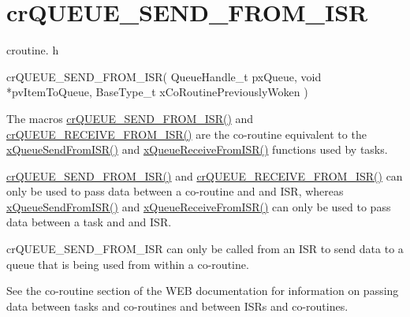 \hypertarget{group__cr_q_u_e_u_e___s_e_n_d___f_r_o_m___i_s_r}{}\section{cr\+Q\+U\+E\+U\+E\+\_\+\+S\+E\+N\+D\+\_\+\+F\+R\+O\+M\+\_\+\+I\+SR}
\label{group__cr_q_u_e_u_e___s_e_n_d___f_r_o_m___i_s_r}
croutine. h 
\begin{DoxyPre}
 crQUEUE\_SEND\_FROM\_ISR(
                           QueueHandle\_t pxQueue,
                           void *pvItemToQueue,
                           BaseType\_t xCoRoutinePreviouslyWoken
                      )\end{DoxyPre}


The macro\textquotesingle{}s \mbox{\hyperlink{croutine_8h_ac8eb0a81c5cf69de7e4edd73ce44a3be}{cr\+Q\+U\+E\+U\+E\+\_\+\+S\+E\+N\+D\+\_\+\+F\+R\+O\+M\+\_\+\+I\+S\+R()}} and \mbox{\hyperlink{croutine_8h_a9c0fa977ca69adbddb4811affa2a71f7}{cr\+Q\+U\+E\+U\+E\+\_\+\+R\+E\+C\+E\+I\+V\+E\+\_\+\+F\+R\+O\+M\+\_\+\+I\+S\+R()}} are the co-\/routine equivalent to the \mbox{\hyperlink{queue_8h_a21d5919ed26c21d121df4a4debeb643c}{x\+Queue\+Send\+From\+I\+S\+R()}} and \mbox{\hyperlink{queue_8h_acdf528f5c91131ae2f31c669cfd65758}{x\+Queue\+Receive\+From\+I\+S\+R()}} functions used by tasks.

\mbox{\hyperlink{croutine_8h_ac8eb0a81c5cf69de7e4edd73ce44a3be}{cr\+Q\+U\+E\+U\+E\+\_\+\+S\+E\+N\+D\+\_\+\+F\+R\+O\+M\+\_\+\+I\+S\+R()}} and \mbox{\hyperlink{croutine_8h_a9c0fa977ca69adbddb4811affa2a71f7}{cr\+Q\+U\+E\+U\+E\+\_\+\+R\+E\+C\+E\+I\+V\+E\+\_\+\+F\+R\+O\+M\+\_\+\+I\+S\+R()}} can only be used to pass data between a co-\/routine and and I\+SR, whereas \mbox{\hyperlink{queue_8h_a21d5919ed26c21d121df4a4debeb643c}{x\+Queue\+Send\+From\+I\+S\+R()}} and \mbox{\hyperlink{queue_8h_acdf528f5c91131ae2f31c669cfd65758}{x\+Queue\+Receive\+From\+I\+S\+R()}} can only be used to pass data between a task and and I\+SR.

cr\+Q\+U\+E\+U\+E\+\_\+\+S\+E\+N\+D\+\_\+\+F\+R\+O\+M\+\_\+\+I\+SR can only be called from an I\+SR to send data to a queue that is being used from within a co-\/routine.

See the co-\/routine section of the W\+EB documentation for information on passing data between tasks and co-\/routines and between I\+SR\textquotesingle{}s and co-\/routines.


